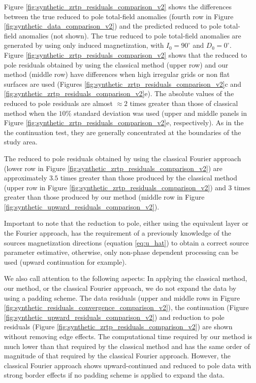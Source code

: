 \documentclass[manuscript]{geophysics}
\begin{document}
Figure \ref{fig:synthetic_zrtp_residuals_comparison_v2} shows the differences
between the true reduced to pole total-field anomalies (fourth row in Figure
\ref{fig:synthetic_data_comparison_v2}) and the predicted reduced to pole total-field 
anomalies (not shown). The true reduced to pole total-field anomalies are generated by using only induced magnetization, with $I_{0} = 90^{\circ}$ and $D_{0} = 0^{\circ}$.
Figure \ref{fig:synthetic_zrtp_residuals_comparison_v2} shows that the reduced to pole residuals 
obtained by using the classical method (upper row) and our method (middle row) have differences when high irregular grids or non flat surfaces are used (Figures \ref{fig:synthetic_zrtp_residuals_comparison_v2}c and \ref{fig:synthetic_zrtp_residuals_comparison_v2}e). The absolute values of the reduced to pole residuals are almost $\approx 2$ times greater than those of classical method when the $10\%$ standard deviation was used (upper and middle panels in Figure \ref{fig:synthetic_zrtp_residuals_comparison_v2}e, respectively).
As in the the continuation test, they are generally concentrated at the boundaries of the study area.


The reduced to pole residuals obtained by using the 
classical Fourier approach (lower row in Figure \ref{fig:synthetic_zrtp_residuals_comparison_v2})
are approximately $3.5$ times greater than those produced by the classical method 
(upper row in Figure \ref{fig:synthetic_zrtp_residuals_comparison_v2}) and $3$ times greater than
those produced by our method (middle row in Figure \ref{fig:synthetic_upward_residuals_comparison_v2}).

Important to note that the reduction to pole, either using the equivalent layer or the Fourier approach, has the requirement of a previously knowledge of the sources magnetization directions (equation \ref{eq:u_hat}) to obtain a correct source parameter estimative, otherwise, only non-phase dependent processing can be used (upward continuation for example).

We also call attention to the following aspects:
In applying the classical method, our method, or the classical Fourier approach, we do not expand 
the data by using a padding scheme.
The data residuals (upper and middle rows in Figure 
\ref{fig:synthetic_residuals_convergence_comparison_v2}), 
the continuation (Figure \ref{fig:synthetic_upward_residuals_comparison_v2}) and reduction to pole residuals (Figure \ref{fig:synthetic_zrtp_residuals_comparison_v2}) are shown without removing edge effects. 
The computational time required by our method is much lower than that required by the classical method
and has the same order of magnitude of that required by the classical Fourier approach.
However, the classical Fourier approach shows upward-continued and reduced to pole data with strong border effects if no padding scheme is applied to expand the data.
\end{document}
